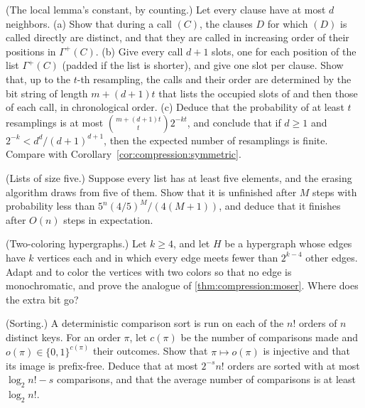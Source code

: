 \begin{refsection}
\begin{exercises}
\item\label{ex:compression:sharp} \consolidation\harder (The local lemma's constant, by counting.) Let every clause have at most $d$ neighbors. (a) Show that during a call \compressionFix$(C)$, the clauses $D$ for which \compressionFix$(D)$ is called directly are distinct, and that they are called in increasing order of their positions in $\Gamma^+(C)$. (b) Give every call $d+1$ slots, one for each position of the list $\Gamma^+(C)$ (padded if the list is shorter), and give \compressionSolve{} one slot per clause. Show that, up to the $t$-th resampling, the calls and their order are determined by the bit string of length $m+(d+1)t$ that lists the occupied slots of \compressionSolve{} and then those of each call, in chronological order. (c) Deduce that the probability of at least $t$ resamplings is at most $\binom{m+(d+1)t}{t}2^{-kt}$, and conclude that if $d\ge1$ and $2^{-k}<d^d/(d+1)^{d+1}$, then the expected number of resamplings is finite. Compare with Corollary~\ref{cor:compression:symmetric}. 

\item\label{ex:compression:five} \consolidation (Lists of size five.) Suppose every list has at least five elements, and the erasing algorithm draws from five of them. Show that it is unfinished after $M$ steps with probability less than $5^n(4/5)^M/(4(M+1))$, and deduce that it finishes after $O(n)$ steps in expectation.

\item\label{ex:compression:hypergraph} \transfer (Two-coloring hypergraphs.) Let $k\ge4$, and let $H$ be a hypergraph whose edges have $k$ vertices each and in which every edge meets fewer than $2^{k-4}$ other edges. Adapt \compressionSolve{} and \compressionFix{} to color the vertices with two colors so that no edge is monochromatic, and prove the analogue of \cref{thm:compression:moser}. Where does the extra bit go?

\item\label{ex:compression:sorting} \transfer (Sorting.) A deterministic comparison sort is run on each of the $n!$ orders of $n$ distinct keys. For an order $\pi$, let $c(\pi)$ be the number of comparisons made and $o(\pi)\in\{0,1\}^{c(\pi)}$ their outcomes. Show that $\pi\mapsto o(\pi)$ is injective and that its image is prefix-free. Deduce that at most $2^{-s}n!$ orders are sorted with at most $\log_2n!-s$ comparisons, and that the average number of comparisons is at least $\log_2n!$. 


\end{exercises}
\end{refsection}
